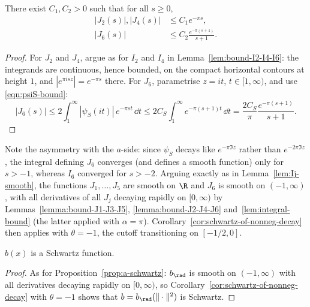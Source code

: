 \begin{lemma}\label{lemma:bound-J2-J4-J6}
    There exist $C_1, C_2 > 0$ such that for all $s \geq 0$,
    \begin{align}
        |J_2(s)|, |J_4(s)| &\le C_1 e^{-\pi s}, \\
        |J_6(s)| &\le C_2 \frac{e^{-\pi (s + 1)}}{s + 1}.
    \end{align}
\end{lemma}
\begin{proof}
For $J_2$ and $J_4$, argue as for $I_2$ and $I_4$ in Lemma~\ref{lem:bound-I2-I4-I6}: the integrands are continuous, hence bounded, on the compact horizontal contours at height $1$, and $|e^{\pi i s z}| = e^{-\pi s}$ there. For $J_6$, parametrise $z = it$, $t \in [1, \infty)$, and use \eqref{eqn:psiS-bound}:
\[
    |J_6(s)| \le 2 \int_1^\infty |\psi_S(it)|\, e^{-\pi s t}\, \dd t \le 2 C_S \int_1^\infty e^{-\pi(s+1)t}\, \dd t = \frac{2C_S}{\pi} \frac{e^{-\pi(s+1)}}{s+1}.
\]
\end{proof}

Note the asymmetry with the $a$-side: since $\psi_S$ decays like $e^{-\pi \Im z}$ rather than $e^{-2\pi \Im z}$, the integral defining $J_6$ converges (and defines a smooth function) only for $s > -1$, whereas $I_6$ converged for $s > -2$. Arguing exactly as in Lemma~\ref{lem:Ij-smooth}, the functions $J_1, \ldots, J_5$ are smooth on $\R$ and $J_6$ is smooth on $(-1, \infty)$, with all derivatives of all $J_j$ decaying rapidly on $[0, \infty)$ by Lemmas~\ref{lemma:bound-J1-J3-J5}, \ref{lemma:bound-J2-J4-J6} and~\ref{lem:integral-bound} (the latter applied with $\alpha = \pi$). Corollary~\ref{cor:schwartz-of-nonneg-decay} then applies with $\theta = -1$, the cutoff transitioning on $[-1/2, 0]$.

\begin{proposition}\label{prop:b-schwartz}\leanok
$b(x)$ is a Schwartz function.
\end{proposition}
\begin{proof}
As for Proposition~\ref{prop:a-schwartz}: $b_\rad$ is smooth on $(-1, \infty)$ with all derivatives decaying rapidly on $[0, \infty)$, so Corollary~\ref{cor:schwartz-of-nonneg-decay} with $\theta = -1$ shows that $b = b_\rad(\|\cdot\|^2)$ is Schwartz.
\end{proof}

